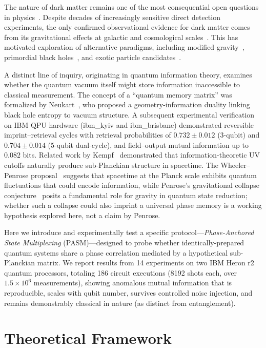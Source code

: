 ﻿\documentclass[12pt,a4paper]{article}
\begin{document}
The nature of dark matter remains one of the most consequential open questions in physics~\cite{bertone2005particle}. Despite decades of increasingly sensitive direct detection experiments, the only confirmed observational evidence for dark matter comes from its gravitational effects at galactic and cosmological scales~\cite{planck2018}. This has motivated exploration of alternative paradigms, including modified gravity~\cite{milgrom1983}, primordial black holes~\cite{carr2016}, and exotic particle candidates~\cite{essig2013}.

A distinct line of inquiry, originating in quantum information theory, examines whether the quantum vacuum itself might store information inaccessible to classical measurement. The concept of a ``quantum memory matrix'' was formalized by Neukart~\cite{neukart2025}, who proposed a geometry-information duality linking black hole entropy to vacuum structure. A subsequent experimental verification~\cite{neukart2026qip} on IBM QPU hardware (ibm\_kyiv and ibm\_brisbane) demonstrated reversible imprint--retrieval cycles with retrieval probabilities of $0.732 \pm 0.012$ (3-qubit) and $0.704 \pm 0.014$ (5-qubit dual-cycle), and field--output mutual information up to $0.082$ bits. Related work by Kempf~\cite{kempf2009} demonstrated that information-theoretic UV cutoffs naturally produce sub-Planckian structure in spacetime. The Wheeler--Penrose proposal~\cite{wheeler1957,penrose1996} suggests that spacetime at the Planck scale exhibits quantum fluctuations that could encode information, while Penrose's gravitational collapse conjecture~\cite{penrose1996} posits a fundamental role for gravity in quantum state reduction; whether such a collapse could also imprint a universal phase memory is a working hypothesis explored here, not a claim by Penrose.

Here we introduce and experimentally test a specific protocol---\textit{Phase-Anchored State Multiplexing} (PASM)---designed to probe whether identically-prepared quantum systems share a phase correlation mediated by a hypothetical sub-Planckian matrix. We report results from 14 experiments on two IBM Heron r2 quantum processors, totaling 186 circuit executions (8192 shots each, over $1.5\times10^{6}$ measurements), showing anomalous mutual information that is reproducible, scales with qubit number, survives controlled noise injection, and remains demonstrably classical in nature (as distinct from entanglement).

\section{Theoretical Framework}
\label{sec:theory}
\end{document}
